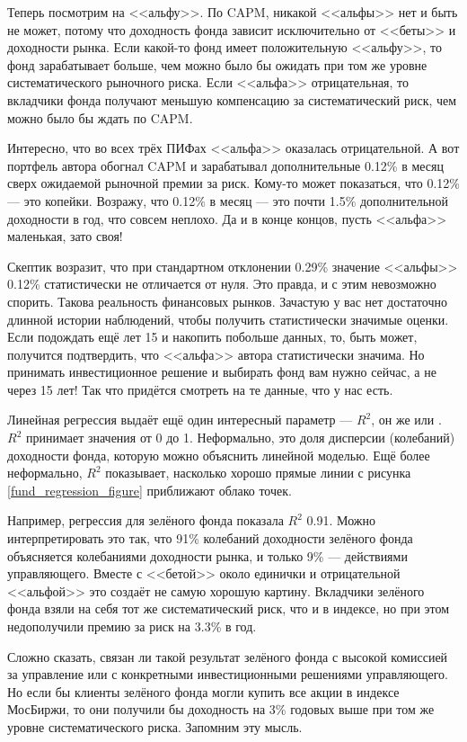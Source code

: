 Теперь посмотрим на <<альфу>>. По CAPM, никакой <<альфы>> нет и быть не может, 
потому что доходность фонда зависит исключительно от <<беты>> и доходности 
рынка. Если какой-то фонд имеет положительную <<альфу>>, то фонд зарабатывает 
больше, чем можно было бы ожидать при том же уровне систематического рыночного 
риска. Если <<альфа>> отрицательная, то вкладчики фонда получают меньшую 
компенсацию за систематический риск, чем можно было бы ждать по CAPM.

Интересно, что во всех трёх ПИФах <<альфа>> оказалась отрицательной. А вот 
портфель автора обогнал CAPM и зарабатывал дополнительные 0.12\% в месяц сверх 
ожидаемой рыночной премии за риск. Кому-то может показаться, что 0.12\% --- это 
копейки. Возражу, что 0.12\% в месяц --- это почти 1.5\% дополнительной 
доходности в год, что совсем неплохо. Да и в конце концов, пусть <<альфа>> 
маленькая, зато своя!

Скептик возразит, что при стандартном отклонении 0.29\% значение <<альфы>> 
0.12\% статистически не отличается от нуля. Это правда, и с этим невозможно 
спорить. Такова реальность финансовых рынков. Зачастую у вас нет достаточно 
длинной истории наблюдений, чтобы получить статистически значимые оценки. Если 
подождать ещё лет 15 и накопить побольше данных, то, быть может, получится 
подтвердить, что <<альфа>> автора статистически значима. Но принимать 
инвестиционное решение и выбирать фонд вам нужно сейчас, а не через 15 лет! Так 
что придётся смотреть на те данные, что у нас есть.

Линейная регрессия выдаёт ещё один интересный параметр --- $R^2$, он же 
 или . $R^2$ принимает значения от 0 до 1. Неформально, это доля 
дисперсии (колебаний) доходности фонда, которую можно объяснить линейной 
моделью. Ещё более неформально, $R^2$ показывает, насколько хорошо прямые линии 
с рисунка \ref{fund_regression_figure} приближают облако точек.

Например, регрессия для зелёного фонда показала $R^2$ 0.91. Можно 
интерпретировать это так, что 91\% колебаний доходности зелёного фонда 
объясняется колебаниями доходности рынка, и только 9\% --- действиями 
управляющего. Вместе с <<бетой>> около единички и отрицательной <<альфой>> это 
создаёт не самую хорошую картину. Вкладчики зелёного фонда взяли на себя тот же 
систематический риск, что и в индексе, но при этом недополучили премию за риск 
на 3.3\% в год. 

Сложно сказать, связан ли такой результат зелёного фонда с высокой комиссией за 
управление или с конкретными инвестиционными решениями управляющего. Но если бы 
клиенты зелёного фонда могли купить все акции в индексе МосБиржи, то они 
получили бы доходность на 3\% годовых выше при том же уровне систематического 
риска. Запомним эту мысль.

